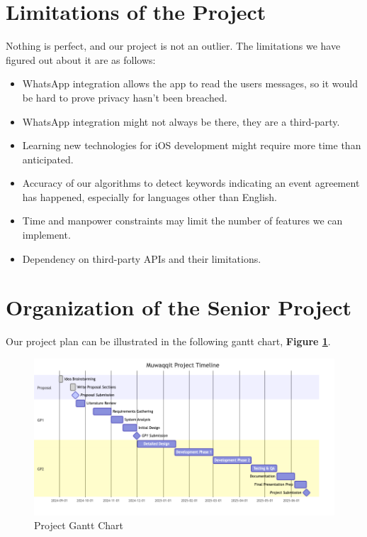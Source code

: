 \documentclass[12pt,a4paper]{report}
\begin{document}
\section{Limitations of the Project}

Nothing is perfect, and our project is not an outlier. The limitations we have figured out about it are as follows:
\begin{itemize}
    \item WhatsApp integration allows the app to read the users messages, so it would be hard to prove privacy hasn't been breached.
    \item WhatsApp integration might not always be there, they are a third-party.
    \item Learning new technologies for iOS development might require more time than anticipated.
    \item Accuracy of our algorithms to detect keywords indicating an event agreement has happened, especially for languages other than English.
    \item Time and manpower constraints may limit the number of features we can implement.
    \item Dependency on third-party APIs and their limitations.
\end{itemize}

\newpage

\section{Organization of the Senior Project}

Our project plan can be illustrated in the following gantt chart, \textbf{Figure \ref{fig:project-gantt-chart}}.

\begin{figure}[!h]
    \centering
    \includegraphics[width=\textwidth]{images/gantt.png}
    \caption{Project Gantt Chart}
    \label{fig:project-gantt-chart}
\end{figure}
\end{document}
